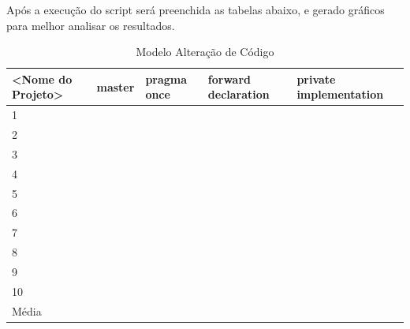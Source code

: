 Após a execução do script será preenchida as tabelas abaixo, e gerado gráficos para melhor
analisar os resultados. 


\begin{table}[!ht]
\centering
\caption{Modelo Alteração de Código}
\label{tab:modelo_alteracao_de_codigo}
\begin{tabular}{lllll}
\textbf{<Nome do Projeto>} & \textbf{master} & \textbf{pragma once} & \textbf{forward declaration} & \textbf{private implementation}   \\ \toprule
1                             &      &     &     &        \\ 
2                             &      &     &     &        \\ 
3                             &      &     &     &        \\ 
4                             &      &     &     &        \\ 
5                             &      &     &     &        \\ 
6                             &      &     &     &        \\ 
7                             &      &     &     &        \\ 
8                             &      &     &     &        \\ 
9                             &      &     &     &        \\ 
10                            &      &     &     &        \\ \bottomrule
Média                         &      &     &     &        \\ 
\end{tabular}
\end{table}



